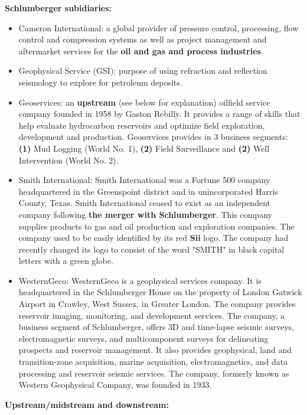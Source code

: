 \documentclass[12pt,a4paper]{article}
\begin{document}
\textbf{Schlumberger subidiaries:}
\begin{itemize}[noitemsep,topsep=0pt]
\item Cameron International: a global provider of pressure control,
  processing, flow control and compression systems as well as project
  management and aftermarket services for the \textbf{oil and gas and
    process industries}.
\item Geophysical Service (GSI): purpose of using refraction and reflection
  seismology to explore for petroleum deposits.
\item Geoservices: an \textbf{upstream} (see below for explanation) oilfield
  service company founded in 1958 by Gaston Rebilly. It provides a range of
  skills that help evaluate hydrocarbon reservoirs and optimize field
  exploration, development and production. Geoservices provides in 3
  business segments: \textbf{(1)} Mud Logging (World No. 1), \textbf{(2)}
  Field Surveillance and \textbf{(2)} Well Intervention (World No. 2).
\item Smith International: Smith International was a Fortune 500 company
  headquartered in the Greenspoint district and in unincorporated Harris
  County, Texas. Smith International ceased to exist as an independent
  company following \textbf{the merger with Schlumberger}. This company
  supplies products to gas and oil production and exploration companies. The
  company used to be easily identified by its red \textbf{Sii} logo. The
  company had recently changed its logo to consist of the word "SMITH" in
  black capital letters with a green globe.
\item WesternGeco: WesternGeco is a geophysical services company. It is
  headquartered in the Schlumberger House on the property of London Gatwick
  Airport in Crawley, West Sussex, in Greater London. The company provides
  reservoir imaging, monitoring, and development services. The company, a
  business segment of Schlumberger, offers 3D and time-lapse seismic
  surveys, electromagnetic surveys, and multicomponent surveys for
  delineating prospects and reservoir management. It also provides
  geophysical, land and transition-zone acquisition, marine acquisition,
  electromagnetics, and data processing and reservoir seismic services. The
  company, formerly known as Western Geophysical Company, was founded in
  1933.
\end{itemize}

\textbf{Upstream/midstream and downstream:}
\end{document}
